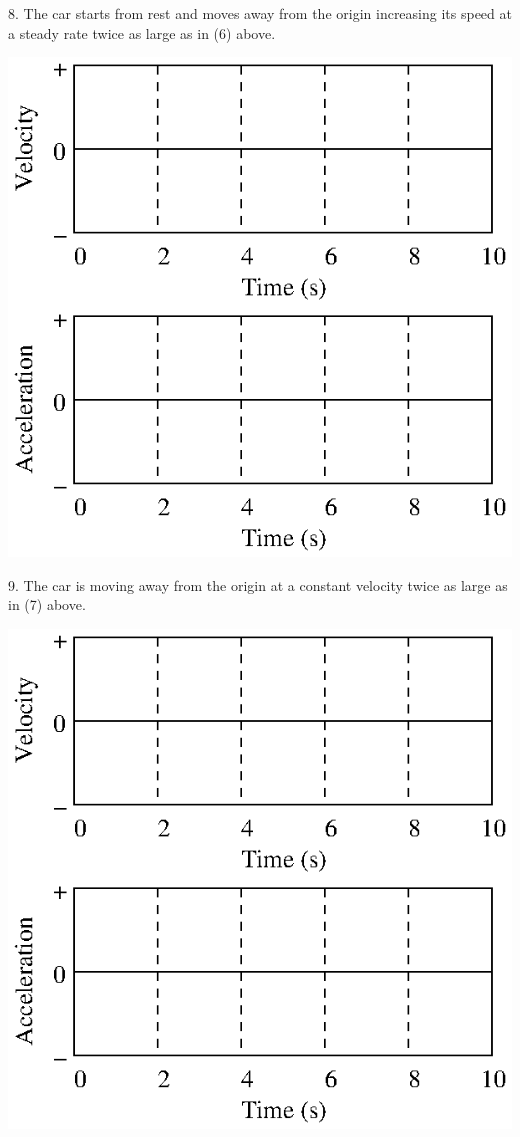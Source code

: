 8. The car starts from rest and moves away from the origin increasing its speed
at a steady rate twice as large as in (6) above.

\vspace{0.3cm}
{\par\centering \includegraphics{changing/changing_fig12.eps} \par}
\vspace{0.3cm}

9. The car is moving away from the origin at a constant velocity twice as large
as in (7) above.

\vspace{0.3cm}
{\par\centering \includegraphics{changing/changing_fig12.eps} \par}
\vspace{0.3cm}

